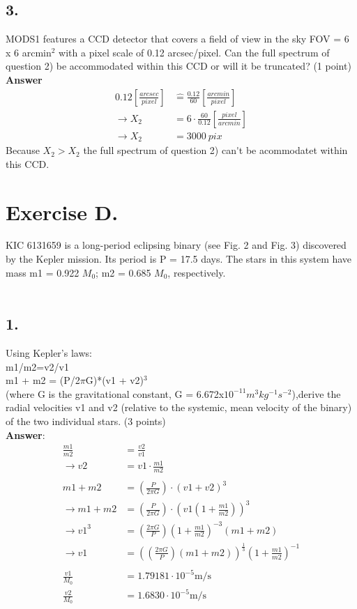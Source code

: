 \documentclass[11pt,a4paper,twoside]{article}
\begin{document}
\subsection*{3.}
MODS1 features a CCD detector that covers a field of view in the sky FOV = 6 x 6 
arcmin$^2$ with a pixel scale of 0.12 arcsec/pixel. Can the full spectrum of question 2)  be accommodated within this CCD or will it be truncated? (1 point)\\
\textbf{Answer}\\
\begin{align*}
0.12\left[\frac{arcsec}{pixel}\right]&\hat{=}\frac{0.12}{60}\left[\frac{arcmin}{pixel}\right]\\
\rightarrow X_2&=6\cdot\frac{60}{0.12}\left[\frac{pixel}{arcmin}\right]\\
\rightarrow X_2&=\SI{3000}{pix}
\end{align*}
Because $X_2>X_2$ the full spectrum of question 2) can\'{}t be acommodatet within this CCD.

\section*{Exercise D.}
KIC 6131659 is a long-period eclipsing binary (see Fig. 2 and Fig. 3) 
discovered by the Kepler mission. Its period is P = 17.5 days. The stars in this system 
have mass m1 = 0.922 $M_0$; m2 = 0.685 $M_0$, respectively.\\
\\
\subsection*{1.} Using Kepler's laws:\\
m1/m2=v2/v1\\
m1 + m2 = (P/2$\pi$G)*(v1 + v2)$^3$\\
(where G is the gravitational constant, G = 6.672x$10^{-11}m^3kg^{-1}s^{-2}$),derive the radial velocities v1 and v2 (relative to the systemic, mean velocity of the binary) of the two individual stars. (3 points)\\
\textbf{Answer}:\\
\begin{align*}
\frac{m1}{m2}&=\frac{v2}{v1}\\
\rightarrow v2&=v1\cdot \frac{m1}{m2}\\
\\
m1 + m2 &= \left(\frac{P}{2\pi G}\right)\cdot(v1 + v2)^3\\
\rightarrow m1 + m2 &= \left(\frac{P}{2\pi G}\right)\cdot \left(v1\left(1 +  \frac{m1}{m2}\right)\right)^3\\
\rightarrow v1^3&=\left(\frac{2\pi G}{P}\right)\left(1+\frac{m1}{m2}\right)^{-3}\left(m1+m2\right)\\
\rightarrow v1&=\left(\left(\frac{2\pi G}{P}\right)\left(m1+m2\right)\right)^{\frac{1}{3}}\left(1+\frac{m1}{m2}\right)^{-1}\\
\\
\frac{v1}{M_0}&=1.79181\cdot 10^{-5}\si{\metre\per\second}\\
\frac{v2}{M_0}&=1.6830\cdot 10^{-5}\si{\metre\per\second}
\end{align*}
\end{document}
